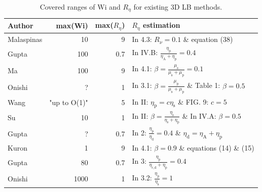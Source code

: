 \documentclass[a4paper,12pt]{scrartcl}
\begin{document}
\begin{table}
\begin{center}
			\begin{tabular}{l|r|r|l}
				Author & max(Wi) & max($R_\eta$) & $R_\eta$ estimation \\
				\hline
				Malaspinas\cite{malaspinas2010} & 10 & 9 & In 4.3: $R_\nu = \num{0.1}$ \& equation (38) \\
				\rowcolor{secondaryBackground}
				Gupta\cite{gupta2015} & 100 & 0.7 & In IV.B: $\frac{\eta_\text{p}}{\eta_\text{A} + \eta_\text{p}} = \num{0.4}$ \\
				Ma\cite{ma2020} & 100 & 9 & In 4.1: $\beta = \frac{\mu_\text{s}}{\mu_\text{s} + \mu_\text{p}} = \num{0.1}$ \\
				\rowcolor{secondaryBackground}
				Onishi\cite{onishi2006} & ? & 1 & In 3.1: $\beta = \frac{\mu_\text{p}}{\mu_\text{s} + \mu_\text{p}}$ \& Table 1: $\beta=\num{0.5}$ \\
				Wang\cite{wang2020} & "up to O(1)" & 5 & In II: $\eta_\text{p} = c\eta_\text{s}$ \& FIG. 9: $c = \num{5}$\\
				\rowcolor{secondaryBackground}
				Su\cite{su2013_2} & 10 & 1  & In II: $\beta = \frac{\eta_\text{s}}{\eta_\text{s} + \eta_\text{p}}$ \& In IV.A: $\beta = \num{0.5}$ \\
				Gupta\cite{gupta2015_2} & ? & 0.7 & In 2: $\frac{\eta_\text{p}}{\eta_\text{d}} = \num{0.4}$ \& $\eta_\text{d} = \eta_\text{A} + \eta_\text{p}$ \\
				\rowcolor{secondaryBackground}
				Kuron\cite{kuron2021} & 1 & 9 & In 4.1: $\beta = \num{0.9}$ \& equations (14) \& (15) \\
				Gupta\cite{gupta2016} & 80 & 0.7 & In 3: $\frac{\eta_\text{p}}{\eta_\text{c,d} + \eta_\text{p}} = \num{0.4}$ \\
				\rowcolor{secondaryBackground}
				Onishi\cite{onishi2005} & 1000 & 1 & In 3.2: $\frac{\eta_\text{p}}{\eta_\text{s}} = \num{1}$ \\
			\end{tabular}
		\end{center}

\caption{Covered ranges of $\mathrm{Wi}$ and $R_\eta$ for existing 3D LB methods.}
\label{tab:viscRatio}
\end{table}
\end{document}

